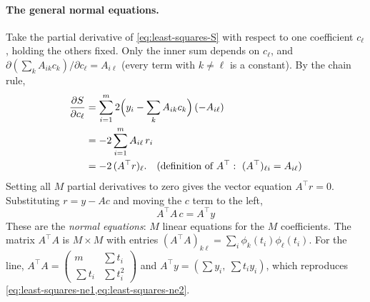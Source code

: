 \paragraph{The general normal equations.} Take the partial derivative of \cref{eq:least-squares-S} with respect to one coefficient $c_\ell$, holding the others fixed. Only the inner sum depends on $c_\ell$, and $\partial(\sum_k A_{ik}c_k)/\partial c_\ell = A_{i\ell}$ (every term with $k\neq\ell$ is a constant). By the chain rule,
\begin{align}
\frac{\partial S}{\partial c_\ell} &= \sum_{i=1}^m 2\Bigl(y_i - \sum_k A_{ik}c_k\Bigr)\,(-A_{i\ell})\nonumber\\
&= -2\sum_{i=1}^m A_{i\ell}\, r_i \nonumber\\
&= -2\,(A^\top r)_\ell . \quad\text{(definition of } A^\top:\ (A^\top)_{\ell i} = A_{i\ell})\label{eq:least-squares-grad}
\end{align}
Setting all $M$ partial derivatives to zero gives the vector equation $A^\top r = 0$. Substituting $r = y - Ac$ and moving the $c$ term to the left,
\begin{equation}
\boxed{\,A^\top A\, c = A^\top y\,}
\label{eq:least-squares-normal}
\end{equation}
These are the \emph{normal equations}: $M$ linear equations for the $M$ coefficients. The matrix $A^\top A$ is $M\times M$ with entries $(A^\top A)_{k\ell} = \sum_i \phi_k(t_i)\phi_\ell(t_i)$. For the line, $A^\top A = \begin{pmatrix} m & \sum t_i\\ \sum t_i & \sum t_i^2\end{pmatrix}$ and $A^\top y = (\sum y_i,\ \sum t_iy_i)$, which reproduces \cref{eq:least-squares-ne1,eq:least-squares-ne2}.

